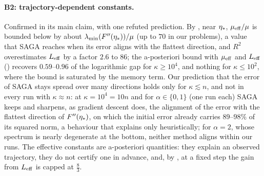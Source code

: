 \paragraph{B2: trajectory-dependent constants.}
Confirmed in its main claim, with one refuted prediction. By , near $\eta_\ast$, $\mu_{\mathrm{eff}}/\mu$ is
bounded below by about $\lambda_{\min}(F''(\eta_\ast))/\mu$ (up to $70$ in our problems), a value that SAGA reaches when its error
aligns with the flattest direction, and $R^2$ overestimates $L_{\mathrm{eff}}$ by a factor $2.6$ to $86$; the a-posteriori bound
with $\mu_{\mathrm{eff}}$ and $L_{\mathrm{eff}}$ () recovers $0.59$--$0.96$ of the logarithmic gap for $\kappa\ge10^4$,
and nothing for $\kappa\le10^2$, where the bound is saturated by the memory term. Our prediction that the error of SAGA
stays spread over many directions holds only for $\kappa\lesssim n$, and not in every run with $\kappa\approx n$: at
$\kappa=10^4=10n$ and for $\alpha\in\{0,1\}$ (one run each) SAGA keeps and sharpens, as gradient descent does, the
alignment of the error with the flattest direction of $F''(\eta_\ast)$, on which the initial error already carries
$89$--$98\%$ of its squared norm, a behaviour that  explains only heuristically; for
$\alpha=2$, whose spectrum is nearly degenerate at the bottom, neither method aligns within our runs. The effective constants are
a-posteriori quantities: they explain an observed trajectory, they do not certify one in advance, and, by
, at a fixed step the gain from $L_{\mathrm{eff}}$ is capped at $\frac83$.

